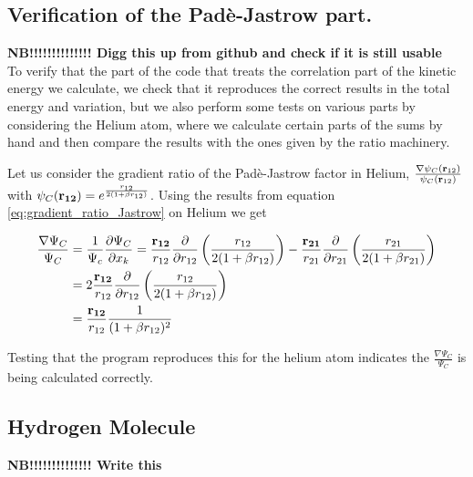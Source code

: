 		\subsection{Verification of the Padè-Jastrow part.}
			\textbf{NB!!!!!!!!!!!!!! Digg this up from github and check if it is still usable}\\
			To verify that the part of the code that treats the correlation part of the kinetic energy we calculate, we check that it reproduces the correct results in the total energy and variation, but we also perform some tests on various parts by considering the Helium atom, where we calculate certain parts of the sums by hand and then compare the results with the ones given by the ratio machinery.

			Let us consider the gradient ratio of the Padè-Jastrow factor in Helium, \(\frac{\nabla\psi_C(\vb{r}_{12})}{\psi_C(\vb{r}_{12})}\) with \(\psi_C(\vb{r_{12}}) = e^{\frac{r_{12}}{2(1+\beta r_{12})}}\). Using the results from equation \eqref{eq:gradient_ratio_Jastrow} on Helium we get

			\begin{align}
				\frac{\nabla\Psi_C}{\Psi_C} &= \frac{1}{\Psi_c} \pdv{\Psi_C}{x_k} = \frac{\vb{r_{12}}}{r_{12}}\pdv{}{r_{12}}\left( \frac{r_{12}}{2(1+\beta r_{12})} \right) - \frac{\vb{r_{21}}}{r_{21}}\pdv{}{r_{21}}\left( \frac{r_{21}}{2(1+\beta r_{21})} \right)
				\\
				&= 2\frac{\vb{r_{12}}}{r_{12}}\pdv{}{r_{12}}\left( \frac{r_{12}}{2(1+\beta r_{12})} \right)
				\\
				&= \frac{\vb{r_{12}}}{r_{12}} \frac{1}{(1+\beta r_{12})^2}
			\end{align}

			Testing that the program reproduces this for the helium atom indicates the \(\frac{\nabla \Psi_C}{\Psi_C}\) is being calculated correctly.

		\subsection{Hydrogen Molecule}
			\textbf{NB!!!!!!!!!!!!!! Write this}\\

